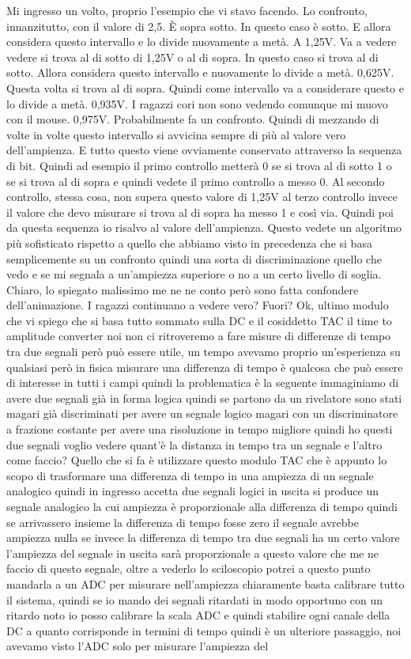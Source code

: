 {Mi ingresso un volto, proprio l'esempio che vi stavo facendo. Lo confronto, innanzitutto, con il valore di 2,5. È sopra sotto. In questo caso è sotto. E allora considera questo intervallo e lo divide nuovamente a metà. A 1,25V. Va a vedere vedere si trova al di sotto di 1,25V o al di sopra. In questo caso si trova al di sotto. Allora considera questo intervallo e nuovamente lo divide a metà. 0,625V. Questa volta si trova al di sopra. Quindi come intervallo va a considerare questo e lo divide a metà. 0,935V. I ragazzi cori non sono vedendo comunque mi muovo con il mouse. 0,975V. Probabilmente fa un confronto. Quindi di mezzando di volte in volte questo intervallo si avvicina sempre di più al valore vero dell'ampienza. E tutto questo viene ovviamente conservato attraverso la sequenza di bit. Quindi ad esempio il primo controllo metterà 0 se si trova al di sotto 1 o se si trova al di sopra e quindi vedete il primo controllo a messo 0. Al secondo controllo, stessa cosa, non supera questo valore di 1,25V al terzo controllo invece il valore che devo misurare si trova al di sopra ha messo 1 e così via. Quindi poi da questa sequenza io risalvo al valore dell'ampienza. Questo vedete un algoritmo più sofisticato rispetto a quello che abbiamo visto in precedenza che si basa semplicemente su un confronto quindi una sorta di discriminazione quello che vedo e se mi segnala a un'ampiezza superiore o no a un certo livello di soglia. Chiaro, lo spiegato malissimo me ne ne conto però sono fatta confondere dell'animazione. I ragazzi continuano a vedere vero? Fuori? Ok, ultimo modulo che vi spiego che si basa tutto sommato sulla DC e il cosiddetto TAC il time to amplitude converter noi non ci ritroveremo a fare misure di differenze di tempo tra due segnali però può essere utile, un tempo avevamo proprio un'esperienza su qualsiasi però in fisica misurare una differenza di tempo è qualcosa che può essere di interesse in tutti i campi quindi la problematica è la seguente immaginiamo di avere due segnali già in forma logica quindi se partono da un rivelatore sono stati magari già discriminati per avere un segnale logico magari con un discriminatore a frazione costante per avere una risoluzione in tempo migliore quindi ho questi due segnali voglio vedere quant'è la distanza in tempo tra un segnale e l'altro come faccio? Quello che si fa è utilizzare questo modulo TAC che è appunto lo scopo di trasformare una differenza di tempo in una ampiezza di un segnale analogico quindi in ingresso accetta due segnali logici in uscita si produce un segnale analogico la cui ampiezza è proporzionale alla differenza di tempo quindi se arrivassero insieme la differenza di tempo fosse zero il segnale avrebbe ampiezza nulla se invece la differenza di tempo tra due segnali ha un certo valore l'ampiezza del segnale in uscita sarà proporzionale a questo valore che me ne faccio di questo segnale, oltre a vederlo lo sciloscopio potrei a questo punto mandarla a un ADC per misurare nell'ampiezza chiaramente basta calibrare tutto il sistema, quindi se io mando dei segnali ritardati in modo opportuno con un ritardo noto io posso calibrare la scala ADC e quindi stabilire ogni canale della DC a quanto corrisponde in termini di tempo quindi è un ulteriore passaggio, noi avevamo visto l'ADC solo per misurare l'ampiezza del }
